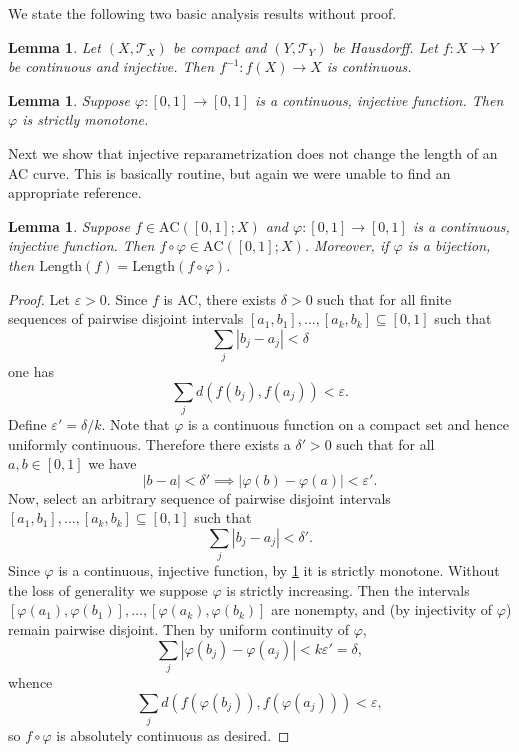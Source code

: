 \documentclass[aos, preprint]{imsart}
\theoremstyle{plain}
\newtheorem{lem}[theorem]{Lemma}
\theoremstyle{remark}
\begin{document}
\begin{appendix}
 We state the following two basic analysis results without proof.

\begin{lem} \label{prop:inv-cont}
  Let $(X,\mathscr{T}_X)$ be compact and $(Y, \mathscr{T}_Y)$ be
  Hausdorff. Let $f : X \to Y$ be continuous and injective. Then
  $f^{-1} : f(X) \to X$ is continuous.
\end{lem}
\begin{lem} \label{prop:inj-mon}
  Suppose $\varphi : [0,1] \to [0,1]$ is a continuous, injective
  function. Then $\varphi$ is strictly monotone.
\end{lem}

Next we show that injective reparametrization does not change the length of an AC curve. This is basically routine, but again we were unable to find an appropriate reference.
\begin{lem} \label{lem:reparam}
  Suppose $f \in \mathrm{AC}([0,1]; X)$ and $\varphi : [0,1] \to
  [0,1]$ is a continuous, injective function. Then $f \circ \varphi
  \in \mathrm{AC}([0,1]; X)$. Moreover, if $\varphi$ is a bijection,
  then $\mathrm{Length}(f) = \mathrm{Length}(f \circ \varphi)$.
\end{lem}

\begin{proof}
  Let $\varepsilon > 0$. Since $f$ is AC, there exists
  $\delta > 0$ such that for all finite sequences of pairwise disjoint
  intervals $[a_1, b_1], \ldots, [a_k, b_k] \subseteq [0,1]$ such that
  \[
    \sum_j |b_j - a_j| < \delta
  \]
  one has
  \[
    \sum_j d(f(b_j), f(a_j)) < \varepsilon.
  \]
  Define $\varepsilon' = \delta/k$. Note that $\varphi$ is a
  continuous function on a compact set and hence uniformly continuous.
  Therefore there exists a $\delta' > 0$ such that for all $a,b \in
  [0,1]$ we have
  \[
    |b-a| < \delta' \implies |\varphi(b) - \varphi(a)| < \varepsilon'.
  \]
  Now, select an arbitrary sequence of pairwise disjoint intervals
  $[a_1, b_1], \ldots, [a_k, b_k] \subseteq [0,1]$ such that
  \[
    \sum_j |b_j - a_j| < \delta'.
  \]
  Since $\varphi$ is a continuous, injective function, by
  \cref{prop:inj-mon} it is strictly monotone. Without the loss of
  generality we suppose $\varphi$ is strictly increasing. Then the
  intervals $[\varphi(a_1), \varphi(b_1)], \ldots, [\varphi(a_k),
  \varphi(b_k)]$ are nonempty, and (by injectivity of $\varphi$)
  remain pairwise disjoint. Then by uniform continuity of $\varphi$,
  \[
    \sum_j |\varphi(b_j) - \varphi(a_j)| < k\varepsilon' = \delta,
  \]
  whence
  \[
    \sum_j d(f(\varphi(b_j)), f(\varphi(a_j))) < \varepsilon,
  \]
  so $f \circ \varphi$ is absolutely continuous as desired.


\end{proof}
\end{appendix}
\end{document}
